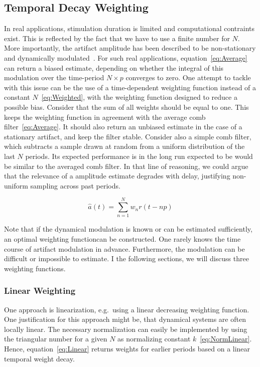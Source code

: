 \documentclass[a4paper]{article}
\begin{document}
\subsection{Temporal Decay Weighting}

In real applications, stimulation duration is limited and computational contraints exist. This is reflected by the fact that we have to use a finite number for $N$. More importantly, the artifact amplitude has been described to be non-stationary  and dynamically modulated~\citep{Noury_2016}.
For such real applications, equation~\eqref{eq:Average} can return a biased estimate, depending on whether the integral of this modulation over the time-period $N\times p$ converges to zero.
One attempt to tackle with this issue can be the use of a time-dependent weighting function instead of a constant $N$~\eqref{eq:Weighted}, with the weighting function designed to reduce a possible bias. Consider that the sum of all weights should be equal to one. This keeps the weighting function in agreement with the average comb filter~\eqref{eq:Average}. It should also return an unbiased estimate in the case of a stationary artifact, and keep the filter stable.
Consider also a simple comb filter, which subtracts a sample drawn at random from a uniform distribution of the last $N$ periods. Its expected performance is in the long run expected to be would be similar to the averaged comb filter. In that line of reasoning, we could argue that the relevance of a amplitude estimate degrades with delay, justifying non-uniform sampling across past periods.

\begin{equation}
    \hat{a}(t) = \sum_{n=1}^{N} w_n r(t - np)\label{eq:Weighted}
\end{equation}

Note that if the dynamical modulation is known or can be estimated sufficiently, an optimal weighting functioncan be constructed. One rarely knows the time course of artifact modulation in advance. Furthermore, the modulation can be difficult or impossible to estimate. I the following sections, we will discuss three weighting functions.

\subsubsection{Linear Weighting}

One approach is linearization, e.g.\ using a linear decreasing weighting function. One justification for this approach might be, that dynamical systems are often locally linear. The necessary normalization can easily be implemented by using the triangular number for a given $N$ as normalizing constant $k$~\eqref{eq:NormLinear}. Hence, equation~\eqref{eq:Linear} returns weights for earlier periods based on a linear temporal weight decay.
\end{document}
